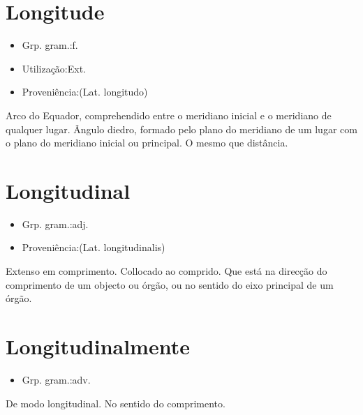 \section{Longitude}
\begin{itemize}
\item {Grp. gram.:f.}
\end{itemize}
\begin{itemize}
\item {Utilização:Ext.}
\end{itemize}
\begin{itemize}
\item {Proveniência:(Lat. \textunderscore longitudo\textunderscore )}
\end{itemize}
Arco do Equador, comprehendido entre o meridiano inicial e o meridiano de qualquer lugar.
Ângulo diedro, formado pelo plano do meridiano de um lugar com o plano do meridiano inicial ou principal.
O mesmo que \textunderscore distância\textunderscore .
\section{Longitudinal}
\begin{itemize}
\item {Grp. gram.:adj.}
\end{itemize}
\begin{itemize}
\item {Proveniência:(Lat. \textunderscore longitudinalis\textunderscore )}
\end{itemize}
Extenso em comprimento.
Collocado ao comprido.
Que está na direcção do comprimento de um objecto ou órgão, ou no sentido do eixo principal de um órgão.
\section{Longitudinalmente}
\begin{itemize}
\item {Grp. gram.:adv.}
\end{itemize}
De modo longitudinal.
No sentido do comprimento.
